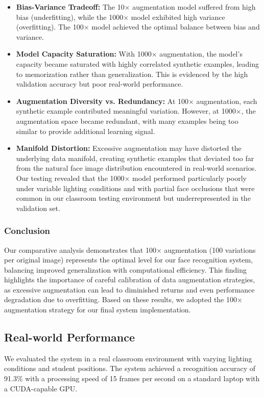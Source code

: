 \documentclass[conference]{IEEEtran}
\begin{document}
\begin{itemize}
\item \textbf{Bias-Variance Tradeoff:} The 10× augmentation model suffered from high bias (underfitting), while the 1000× model exhibited high variance (overfitting). The 100× model achieved the optimal balance between bias and variance.

\item \textbf{Model Capacity Saturation:} With 1000× augmentation, the model's capacity became saturated with highly correlated synthetic examples, leading to memorization rather than generalization. This is evidenced by the high validation accuracy but poor real-world performance.

\item \textbf{Augmentation Diversity vs. Redundancy:} At 100× augmentation, each synthetic example contributed meaningful variation. However, at 1000×, the augmentation space became redundant, with many examples being too similar to provide additional learning signal.

\item \textbf{Manifold Distortion:} Excessive augmentation may have distorted the underlying data manifold, creating synthetic examples that deviated too far from the natural face image distribution encountered in real-world scenarios. Our testing revealed that the 1000× model performed particularly poorly under variable lighting conditions and with partial face occlusions that were common in our classroom testing environment but underrepresented in the validation set.
\end{itemize}

\subsubsection{Conclusion}
Our comparative analysis demonstrates that 100× augmentation (100 variations per original image) represents the optimal level for our face recognition system, balancing improved generalization with computational efficiency. This finding highlights the importance of careful calibration of data augmentation strategies, as excessive augmentation can lead to diminished returns and even performance degradation due to overfitting. Based on these results, we adopted the 100× augmentation strategy for our final system implementation.

\subsection{Real-world Performance}
We evaluated the system in a real classroom environment with varying lighting conditions and student positions. The system achieved a recognition accuracy of 91.3\% with a processing speed of 15 frames per second on a standard laptop with a CUDA-capable GPU.
\end{document}
